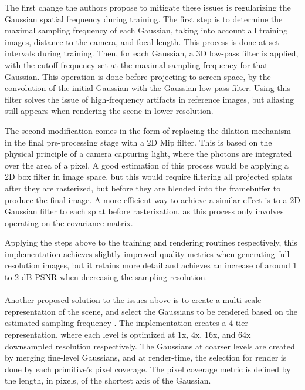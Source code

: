 The first change the authors propose to mitigate these issues is regularizing the Gaussian spatial frequency during training. The first step is to determine the maximal sampling frequency of each Gaussian, taking into account all training images, distance to the camera, and focal length. This process is done at set intervals during training. Then, for each Gaussian, a 3D low-pass filter is applied, with the cutoff frequency set at the maximal sampling frequency for that Gaussian. This operation is done before projecting to screen-space, by the convolution of the initial Gaussian with the Gaussian low-pass filter. Using this filter solves the issue of high-frequency artifacts in reference images, but aliasing still appears when rendering the scene in lower resolution.

The second modification comes in the form of replacing the dilation mechanism in the final pre-processing stage with a 2D Mip filter. This is based on the physical principle of a camera capturing light, where the photons are integrated over the area of a pixel. A good estimation of this process would be applying a 2D box filter in image space, but this would require filtering all projected splats after they are rasterized, but before they are blended into the framebuffer to produce the final image. A more efficient way to achieve a similar effect is to a 2D Gaussian filter to each splat before rasterization, as this process only involves operating on the covariance matrix.

Applying the steps above to the training and rendering routines respectively, this implementation achieves slightly improved quality metrics when generating full-resolution images, but it retains more detail and achieves an increase of around 1 to 2 dB PSNR when decreasing the sampling resolution.
\paragraph{}
Another proposed solution to the issues above is to create a multi-scale representation of the scene, and select the Gaussians to be rendered based on the estimated sampling frequency \cite{yan2024multiscale3dgaussiansplatting}. The implementation creates a 4-tier representation, where each level is optimized at 1x, 4x, 16x, and 64x downsampled resolution respectively. The Gaussians at coarser levels are created by merging fine-level Gaussians, and at render-time, the selection for render is done by each primitive's pixel coverage. The pixel coverage metric is defined by the length, in pixels, of the shortest axis of the Gaussian.

